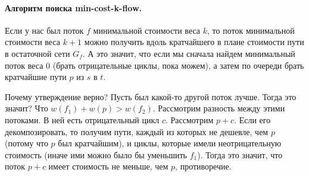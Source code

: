\documentclass[12pt]{article}
\begin{document}
\paragraph{Алгоритм поиска min-cost-k-flow.} Если у нас был поток $f$ минимальной стоимости веса $k$, то поток минимальной стоимости веса $k+1$ можно получить вдоль кратчайшего в плане стоимости пути в остаточной сети $G_f$. А это значит, что если мы сначала найдем минимальный поток веса 0 (брать отрицательные циклы, пока можем), а затем по очереди брать кратчайшие пути $p$ из $s$ в $t$.

Почему утверждение верно? Пусть был какой-то другой поток лучше. Тогда это значит? Что $w(f_1) + w(p) > w(f_2)$. Рассмотрим разность между этими потоками. В ней есть отрицательный цикл $c$. Рассмотрим $p + c$. Если его декомпозировать, то получим пути, каждый из которых не дешевле, чем $p$ (потому что $p$ был кратчайшим), и циклы, которые имели неотрицательную стоимость (иначе ими можно было бы уменьшить $f_1$). Тогда это значит, что поток $p + c$ имеет стоимость не меньше, чем $p$, противоречие.
\end{document}
